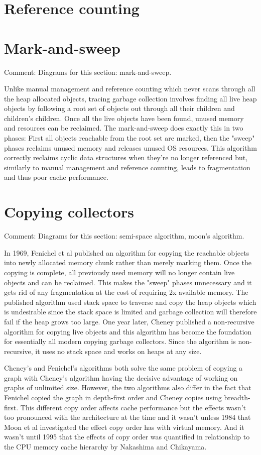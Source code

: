 \documentclass[a4paper,oneside]{memoir}
\newcommand{\makecomment}[1]{{\color{red} Comment: #1}}
\begin{document}
\section{Reference counting}
\section{Mark-and-sweep}
\makecomment{Diagrams for this section: mark-and-sweep.}

Unlike manual management and reference counting which never scans through all
the heap allocated objects, tracing garbage collection involves finding all live
heap objects by following a root set of objects out through all their children
and children's children. Once all the live objects have been found, unused memory
and resources can be reclaimed.
The mark-and-sweep does exactly this in two phases: First all objects reachable
from the root set are marked, then the "sweep" phases reclaims unused memory and
releases unused OS resources.
This algorithm correctly reclaims cyclic data structures when they're no longer
referenced but, similarly to manual management and reference counting, leads to
fragmentation and thus poor cache performance.

\section{Copying collectors}
\makecomment{Diagrams for this section: semi-space algorithm, moon's algorithm.}

In 1969, Fenichel et al published an algorithm for copying the reachable objects
into newly allocated memory chunk rather than merely marking them. Once the copying
is complete, all previously used memory will no longer contain live objects
and can be reclaimed. This makes the "sweep" phases unnecessary and it gets rid
of any fragmentation at the cost of requiring 2x available memory. The published
algorithm used stack space to traverse and copy the heap objects which is
undesirable since the stack space is limited and garbage collection will therefore
fail if the heap grows too large. One year later, Cheney published a non-recursive
algorithm for copying live objects and this algorithm has become the foundation
for essentially all modern copying garbage collectors. Since the algorithm is
non-recursive, it uses no stack space and works on heaps at any size.

Cheney's and Fenichel's algorithms both solve the same problem of copying a graph
with Cheney's algorithm having the decisive advantage of working on graphs of
unlimited size. However, the two algorithms also differ in the fact that Fenichel
copied the graph in depth-first order and Cheney copies using breadth-first. This
different copy order affects cache performance but the effects wasn't too pronounced
with the architecture at the time and it wasn't unless 1984 that Moon et al
investigated the effect copy order has with virtual memory. And it wasn't until
1995 that the effects of copy order was quantified in relationship to the
CPU memory cache hierarchy by Nakashima and Chikayama.
\end{document}
